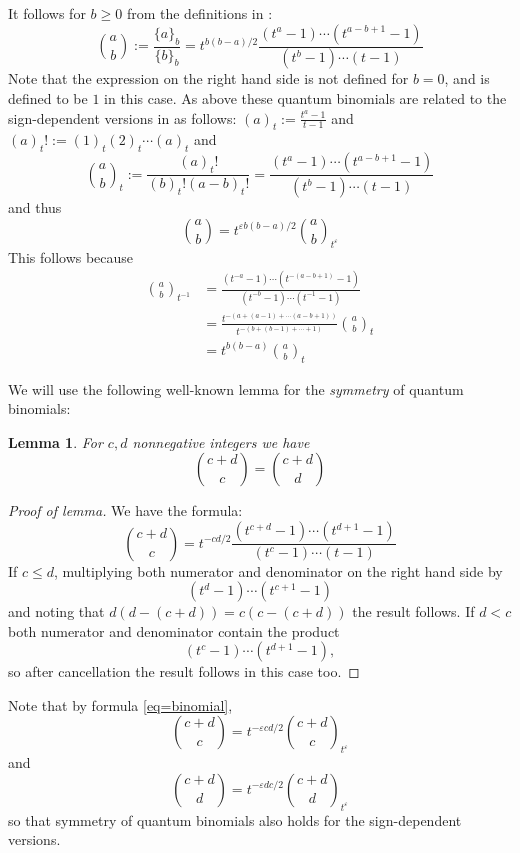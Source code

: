 \documentclass[11pt]{article}
\newtheorem{lem}[thm]{Lemma}
\theoremstyle{definition}
\theoremstyle{remark}
\theoremstyle{remark}
\begin{document}
It follows for $b\geq 0$ from the definitions in \cite{G}:
\begin{equation*}
{a \choose b}:=\frac{\{a\}_b}{\{b\}_b}=t^{b(b-a)/2}\frac{(t^a-1)\cdots (t^{a-b+1}-1)}{(t^b-1)\cdots (t-1)}
\end{equation*}
Note that the expression on the right hand side is not defined for $b=0$, and is defined to be $1$ in this case. 
As above these quantum binomials are related to the sign-dependent versions in \cite{GL} as follows:
$(a)_t:=\frac{t^a-1}{t-1}$ and 
$(a)_t!:=(1)_t(2)_t\cdots (a)_t$
and
$${{a}\choose {b}}_t:=\frac{(a)_t!}{(b)_t!(a-b )_t!}=\frac{(t^a-1)\cdots (t^{a-b+1}-1)}{(t^b-1)\cdots (t-1)}$$
and thus 
\begin{equation}\label{eq=binomial}
{a \choose b}=t^{\varepsilon b(b-a)/2}{{a}\choose {b}}_{t^{\varepsilon }}
\end{equation}
This follows because
\begin{align*}
{{a}\choose {b}}_{t^{-1}}&=\frac{(t^{-a}-1)\cdots (t^{-(a-b+1)}-1)}{(t^{-b}-1)\cdots (t^{-1}-1)} \\
&=\frac{t^{-(a+(a-1)+\cdots (a-b+1))}}{t^{-(b+(b-1)+\cdots +1)}}{a\choose b}_t\\
&=t^{b(b-a)}{a\choose b}_t
\end{align*}

We will use the following well-known lemma for the \textit{symmetry} of quantum binomials:

\begin{lem} \label{lem=binomial symmetry} For $c,d$ nonnegative integers we have 
$${c+d \choose c}={c+d \choose d}$$ 
\end{lem}
\begin{proof}[Proof of lemma] We have the formula:
$${c+d\choose c}=t^{-cd/2}\frac{(t^{c+d}-1)\cdots (t^{d+1}-1)}{(t^c-1)\cdots (t-1)}$$
If $c\leq d$, multiplying both numerator and denominator on the right hand side by
$$(t^d-1)\cdots (t^{c+1}-1)$$
and noting that $d(d-(c+d))=c(c-(c+d))$ the result follows. 
If $d<c$ both numerator and denominator contain the product
$$(t^c-1)\cdots (t^{d+1}-1),$$
so after cancellation the result follows in this case too.
\end{proof}

Note that by formula \eqref{eq=binomial},
$${c+d\choose c}=t^{-\varepsilon cd/2}{c+d\choose c}_{t^{\varepsilon }}$$
and 
$${c+d\choose d}=t^{-\varepsilon dc/2}{c+d\choose d}_{t^{\varepsilon }}$$
so that symmetry of quantum binomials also holds for the sign-dependent versions. 
\end{document}
